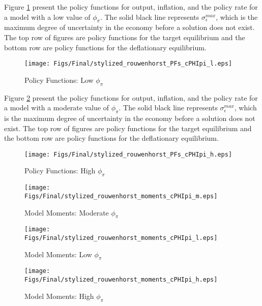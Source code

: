 \documentclass[11pt]{article}
\begin{document}
\begin{singlespace}
		
		Figure \ref{fig:PFsLowcPHIpi} present the policy functions for output, inflation, and the policy rate for a model with a low value of $\phi_{\pi}$. The solid black line represents $\sigma^{max}_{\epsilon}$, which is the maximum degree of uncertainty in the economy before a solution does not exist. The top row of figures are policy functions for the target equilibrium and the bottom row are policy functions for the deflationary equilibrium.  
		
		\begin{figure}[!ht]
			\begin{center}
				\caption{Policy Functions: Low  $\phi_{\pi}$}
				\texttt{[image: Figs/Final/stylized\_rouwenhorst\_PFs\_cPHIpi\_l.eps]}\label{fig:PFsLowcPHIpi}
			\end{center}
		\end{figure}
		
		Figure \ref{fig:PFsHighcPHIpi} present the policy functions for output, inflation, and the policy rate for a model with a moderate value of $\phi_{\pi}$. The solid black line represents $\sigma^{max}_{\epsilon}$, which is the maximum degree of uncertainty in the economy before a solution does not exist. The top row of figures are policy functions for the target equilibrium and the bottom row are policy functions for the deflationary equilibrium. 
		
		\begin{figure}[!ht]
			\begin{center}
				\caption{Policy Functions: High  $\phi_{\pi}$}
				\texttt{[image: Figs/Final/stylized\_rouwenhorst\_PFs\_cPHIpi\_h.eps]}\label{fig:PFsHighcPHIpi}
			\end{center}
		\end{figure}
		
		
		
		\begin{figure}[h]  %
			\begin{center}
				\caption{Model Moments: Moderate  $\phi_{\pi}$}
				\texttt{[image: Figs/Final/stylized\_rouwenhorst\_moments\_cPHIpi\_m.eps]}\label{fig:MomentsModeratecPHIpi}
			\end{center}
		\end{figure}
		\begin{figure}[h]  %
			\begin{center}
				\caption{Model Moments: Low  $\phi_{\pi}$}
				\texttt{[image: Figs/Final/stylized\_rouwenhorst\_moments\_cPHIpi\_l.eps]}\label{fig:MomentsLowcPHIpi}
			\end{center}
		\end{figure}
		
		
		\begin{figure}[h] %
			\begin{center}
				\caption{Model Moments: High  $\phi_{\pi}$}
				\texttt{[image: Figs/Final/stylized\_rouwenhorst\_moments\_cPHIpi\_h.eps]}\label{fig:MomentsHighcPHIpi}
			\end{center}
		\end{figure}
		
	\end{singlespace}
	
	
\end{document}
